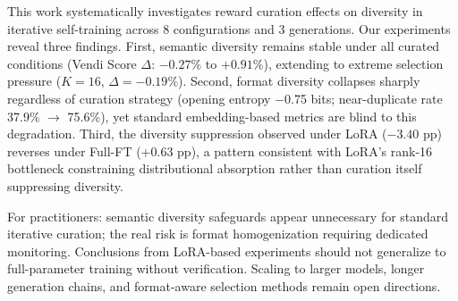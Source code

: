 
This work systematically investigates reward curation effects on diversity in iterative self-training across 8 configurations and 3 generations. Our experiments reveal three findings. First, semantic diversity remains stable under all curated conditions (Vendi Score $\Delta$: $-0.27\%$ to $+0.91\%$), extending to extreme selection pressure ($K{=}16$, $\Delta = -0.19\%$). Second, format diversity collapses sharply regardless of curation strategy (opening entropy $-$0.75 bits; near-duplicate rate 37.9\% $\rightarrow$ 75.6\%), yet standard embedding-based metrics are blind to this degradation. Third, the diversity suppression observed under LoRA ($-3.40$ pp) reverses under Full-FT ($+0.63$ pp), a pattern consistent with LoRA's rank-16 bottleneck constraining distributional absorption rather than curation itself suppressing diversity.

For practitioners: semantic diversity safeguards appear unnecessary for standard iterative curation; the real risk is format homogenization requiring dedicated monitoring. Conclusions from LoRA-based experiments should not generalize to full-parameter training without verification. Scaling to larger models, longer generation chains, and format-aware selection methods remain open directions.
